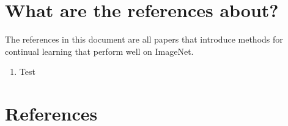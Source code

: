 \documentclass{article}
\author{by Henry Bourne}
\date{\today}
\newcommand{\setfoldernameastitle}{%
  \begingroup
  \edef\x{\endgroup\noexpand\title{\currfilebase}}\x
}
\begin{document}
\setfoldernameastitle %

\maketitle

\section{What are the references about?}
The references in this document are all papers that introduce methods for continual learning that perform well on ImageNet. 

\begin{enumerate}
  \item Test
\end{enumerate}

\section{References}
\end{document}

